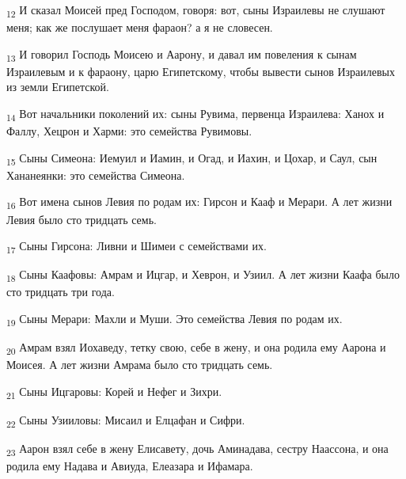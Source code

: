 \begin{tcolorbox}
\textsubscript{12} И сказал Моисей пред Господом, говоря: вот, сыны Израилевы не слушают меня; как же послушает меня фараон? а я не словесен.
\end{tcolorbox}
\begin{tcolorbox}
\textsubscript{13} И говорил Господь Моисею и Аарону, и давал им повеления к сынам Израилевым и к фараону, царю Египетскому, чтобы вывести сынов Израилевых из земли Египетской.
\end{tcolorbox}
\begin{tcolorbox}
\textsubscript{14} Вот начальники поколений их: сыны Рувима, первенца Израилева: Ханох и Фаллу, Хецрон и Харми: это семейства Рувимовы.
\end{tcolorbox}
\begin{tcolorbox}
\textsubscript{15} Сыны Симеона: Иемуил и Иамин, и Огад, и Иахин, и Цохар, и Саул, сын Хананеянки: это семейства Симеона.
\end{tcolorbox}
\begin{tcolorbox}
\textsubscript{16} Вот имена сынов Левия по родам их: Гирсон и Кааф и Мерари. А лет жизни Левия было сто тридцать семь.
\end{tcolorbox}
\begin{tcolorbox}
\textsubscript{17} Сыны Гирсона: Ливни и Шимеи с семействами их.
\end{tcolorbox}
\begin{tcolorbox}
\textsubscript{18} Сыны Каафовы: Амрам и Ицгар, и Хеврон, и Узиил. А лет жизни Каафа было сто тридцать три года.
\end{tcolorbox}
\begin{tcolorbox}
\textsubscript{19} Сыны Мерари: Махли и Муши. Это семейства Левия по родам их.
\end{tcolorbox}
\begin{tcolorbox}
\textsubscript{20} Амрам взял Иохаведу, тетку свою, себе в жену, и она родила ему Аарона и Моисея. А лет жизни Амрама было сто тридцать семь.
\end{tcolorbox}
\begin{tcolorbox}
\textsubscript{21} Сыны Ицгаровы: Корей и Нефег и Зихри.
\end{tcolorbox}
\begin{tcolorbox}
\textsubscript{22} Сыны Узииловы: Мисаил и Елцафан и Сифри.
\end{tcolorbox}
\begin{tcolorbox}
\textsubscript{23} Аарон взял себе в жену Елисавету, дочь Аминадава, сестру Наассона, и она родила ему Надава и Авиуда, Елеазара и Ифамара.
\end{tcolorbox}
